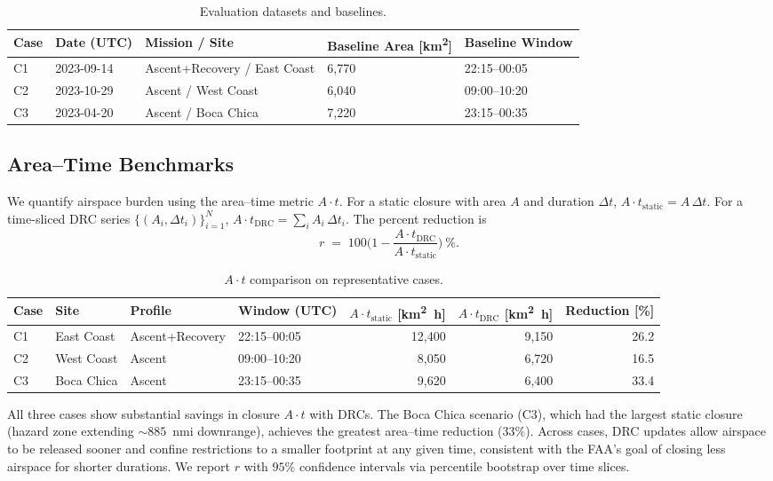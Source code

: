 \documentclass[journal]{new-aiaa}
\newcommand{\At}{\ensuremath{A\cdot t}}
\newcommand{\DRC}{\textsc{DRC}}
\begin{document}
\begin{table}[h!]
\centering
\caption{Evaluation datasets and baselines.}
\label{tab:datasets}
\begin{tabular}{@{}p{1.5cm}p{2.5cm}p{2.8cm}p{2.0cm}p{2.0cm}@{}}
\toprule
Case & Date (UTC) & Mission / Site & Baseline Area [\si{\kilo\meter\squared}] & Baseline Window \\
\midrule
C1 & 2023-09-14 & Ascent+Recovery / East Coast & 6,770 & 22:15--00:05 \\
C2 & 2023-10-29 & Ascent / West Coast & 6,040 & 09:00--10:20 \\
C3 & 2023-04-20 & Ascent / Boca Chica & 7,220 & 23:15--00:35 \\
\bottomrule
\end{tabular}
\end{table}

\subsection{Area--Time Benchmarks}
We quantify airspace burden using the area--time metric \At{}. For a static closure with area $A$ and duration $\Delta t$, $\At_\mathrm{static}=A\,\Delta t$. For a time-sliced \DRC{} series $\{(A_i,\Delta t_i)\}_{i=1}^N$, $\At_\mathrm{DRC}=\sum_i A_i\,\Delta t_i$. The percent reduction is
\begin{equation}
    r \;=\; 100\Big(1 - \frac{\At_\mathrm{DRC}}{\At_\mathrm{static}}\Big)\ \%.
\end{equation}

\begin{table}[t]
\centering
\caption{\At{} comparison on representative cases.}
\label{tab:at_bench}
\begin{tabular}{@{}llllrrr@{}}
\toprule
Case & Site & Profile & Window (UTC) & $\At_\mathrm{static}$ [\si{\kilo\meter\squared\hour}] & $\At_\mathrm{DRC}$ [\si{\kilo\meter\squared\hour}] & Reduction [\%] \\
\midrule
C1 & East Coast & Ascent+Recovery & 22{:}15--00{:}05 & 12{,}400 & 9{,}150 & 26.2 \\
C2 & West Coast & Ascent & 09{:}00--10{:}20 & 8{,}050 & 6{,}720 & 16.5 \\
C3 & Boca Chica & Ascent & 23{:}15--00{:}35 & 9{,}620 & 6{,}400 & 33.4 \\
\bottomrule
\end{tabular}
\end{table}

All three cases show substantial savings in closure \At{} with DRCs. The Boca Chica scenario (C3), which had the largest static closure (hazard zone extending $\sim\!885$~nmi downrange), achieves the greatest area–time reduction ($33\%$). Across cases, \DRC{} updates allow airspace to be released sooner and confine restrictions to a smaller footprint at any given time, consistent with the FAA’s goal of closing less airspace for shorter durations.\cite{FAA2023} We report $r$ with $95\%$ confidence intervals via percentile bootstrap over time slices.
\end{document}
